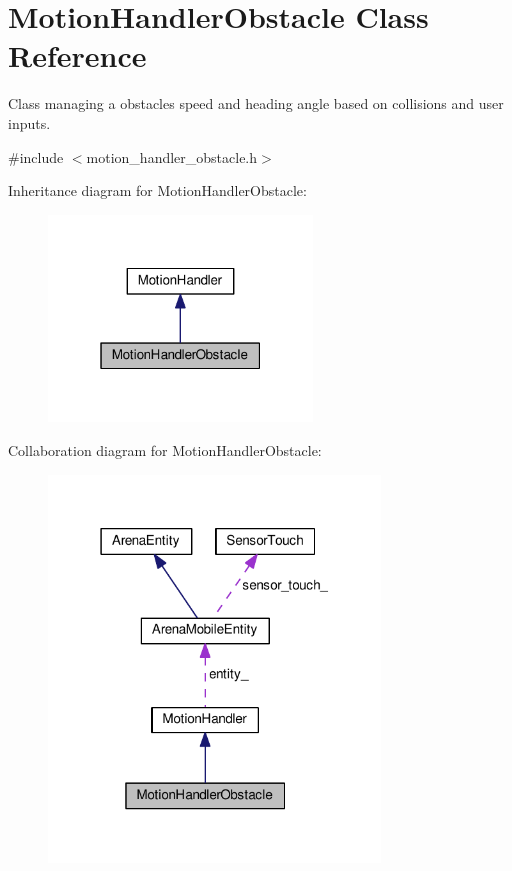 \hypertarget{classMotionHandlerObstacle}{}\section{Motion\+Handler\+Obstacle Class Reference}
\label{classMotionHandlerObstacle}


Class managing a obstacle\textquotesingle{}s speed and heading angle based on collisions and user inputs.  




{\ttfamily \#include $<$motion\+\_\+handler\+\_\+obstacle.\+h$>$}



Inheritance diagram for Motion\+Handler\+Obstacle\+:
\nopagebreak
\begin{figure}[H]
\begin{center}
\leavevmode
\includegraphics[width=199pt]{classMotionHandlerObstacle__inherit__graph}
\end{center}
\end{figure}


Collaboration diagram for Motion\+Handler\+Obstacle\+:
\nopagebreak
\begin{figure}[H]
\begin{center}
\leavevmode
\includegraphics[width=250pt]{classMotionHandlerObstacle__coll__graph}
\end{center}
\end{figure}

